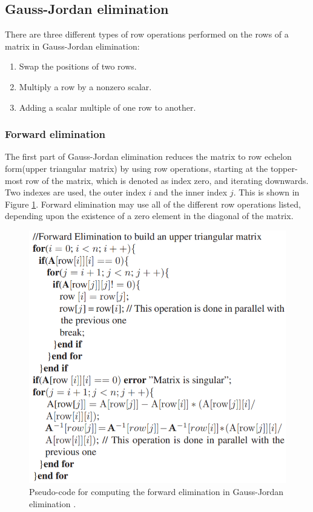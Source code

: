 \subsection{Gauss-Jordan elimination}
\label{sec:gauss_jordan_theory}
There are three different types of row operations performed on the rows of a matrix in Gauss-Jordan elimination:
\begin{enumerate}
\item Swap the positions of two rows. 
\item Multiply a row by a nonzero scalar. 
\item Adding a scalar multiple of one row to another.
\end{enumerate}  

\subsubsection{Forward elimination}
The first part of Gauss-Jordan elimination reduces the matrix to row echelon form(upper triangular matrix) by using row operations, starting at the topper-most row of the matrix, which is denoted as index zero, and iterating downwards. Two indexes are used, the outer index $i$ and the inner index $j$. This is shown in Figure \ref{fig:forward_elimination_pseudocode}. Forward elimination may use all of the different row operations listed, depending upon the existence of a zero element in the diagonal of the matrix.   

\begin{figure}[H]
\centering
   \includegraphics[scale=0.5]{images/forward_elimination_pseudocode.PNG}
  \caption{ Pseudo-code for computing the forward elimination in Gauss-Jordan elimination \cite{gauss_jordan_fpga}. } 
  \label{fig:forward_elimination_pseudocode}
\end{figure}


